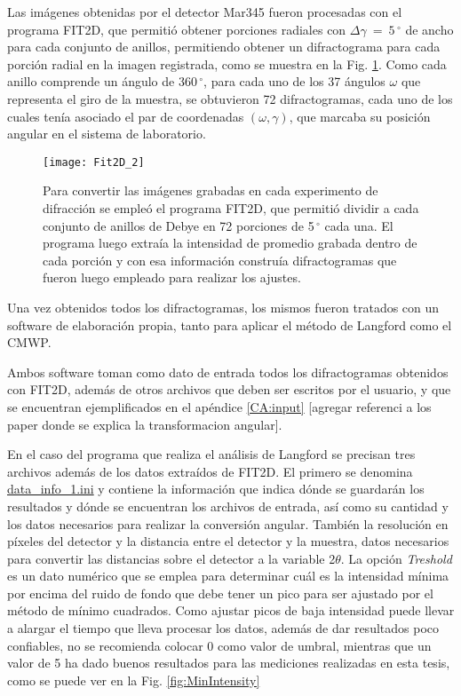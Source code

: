 Las imágenes obtenidas por el detector Mar345 fueron procesadas con el programa FIT2D\cite{FIT2D}, que permitió obtener porciones radiales con $\Delta \gamma \ = \ 5\,^{\circ}$ de ancho para cada conjunto de anillos, permitiendo obtener un difractograma para cada porción radial en la imagen registrada, como se muestra en la Fig. \ref{fig:fit2d}.
Como cada anillo comprende un ángulo de 360\,$^{\circ}$, para cada uno de los 37 ángulos $\omega$ que representa el giro de la muestra, se obtuvieron 72 difractogramas, cada uno de los cuales tenía asociado el par de coordenadas $(\omega, \gamma)$, que marcaba su posición angular en el sistema de laboratorio.

\begin{figure}[!htb] 
  \centering
  \texttt{[image: Fit2D\_2]}
  \caption{Para convertir las imágenes grabadas en cada experimento de difracción se empleó el programa FIT2D, que permitió dividir a cada conjunto de anillos de Debye en 72 porciones de 5\,$^{\circ}$ cada una. El programa luego extraía la intensidad de promedio grabada dentro de cada porción y con esa información construía difractogramas que fueron luego empleado para realizar los ajustes.}
  \label{fig:fit2d}
\end{figure}

Una vez obtenidos todos los difractogramas, los mismos fueron tratados con un software de elaboración propia, tanto para aplicar el método de Langford como el CMWP.

Ambos software toman como dato de entrada todos los difractogramas obtenidos con FIT2D, además de otros archivos que deben ser escritos por el usuario, y que se encuentran ejemplificados en el apéndice \ref{CA:input} [agregar referenci a los paper donde se explica la transformacion angular].

En el caso del programa que realiza el análisis de Langford se precisan tres archivos además de los datos extraídos de FIT2D.
El primero se denomina \hyperlink{datainfo}{data\_info\_1.ini} y contiene la información que indica dónde se guardarán los resultados y dónde se encuentran los archivos de entrada, así como su cantidad y los datos necesarios para realizar la conversión angular.
También la resolución en píxeles del detector y la distancia entre el detector y la muestra, datos necesarios para convertir las distancias sobre el detector a la variable 2$\theta$.
La opción \textit{Treshold} es un dato numérico que se emplea para determinar cuál es la intensidad mínima por encima del ruido de fondo que debe tener un pico para ser ajustado por el método de mínimo cuadrados. 
Como ajustar picos de baja intensidad puede llevar a alargar el tiempo que lleva procesar los datos, además de dar resultados poco confiables, no se recomienda colocar 0 como valor de umbral, mientras que un valor de 5 ha dado buenos resultados para las mediciones realizadas en esta tesis, como se puede ver en la Fig. \ref{fig:MinIntensity}

